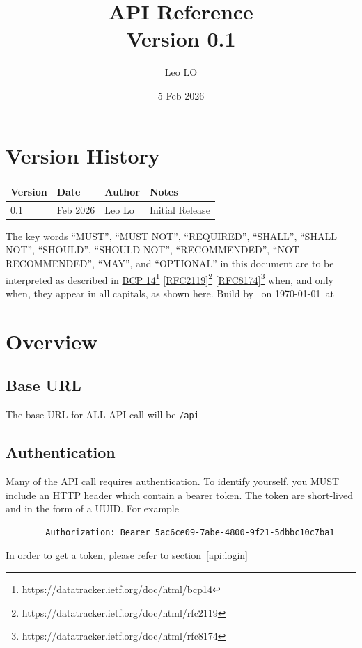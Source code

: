 \documentclass[12pt]{report}
\title{API Reference\\Version 0.1}
\author{Leo LO}
\date{5 Feb 2026}
\begin{document}
    \maketitle
    \chapter*{Version History}
    \begin{tabular}{|l|l|l|p{10cm}|}
        \hline
        Version & Date & Author & Notes \\\hline
        0.1 & Feb 2026 & Leo Lo & Initial Release \\\hline
    \end{tabular}
    \tableofcontents

    \pagebreak
    \hspace{0pt}
    \vfill
    The key words ``MUST'', ``MUST NOT'', ``REQUIRED'', ``SHALL'', ``SHALL NOT'', ``SHOULD'', ``SHOULD NOT'',
    ``RECOMMENDED'', ``NOT RECOMMENDED'', ``MAY'', and ``OPTIONAL'' in this document are to be interpreted as described
    in \href{https://datatracker.ietf.org/doc/html/bcp14}{BCP 14}\footnote{https://datatracker.ietf.org/doc/html/bcp14}
    [\href{https://datatracker.ietf.org/doc/html/rfc2119}{RFC2119}]\footnote{https://datatracker.ietf.org/doc/html/rfc2119}
    [\href{https://datatracker.ietf.org/doc/html/rfc8174}{RFC8174}]\footnote{https://datatracker.ietf.org/doc/html/rfc8174}
    when, and only when, they appear in all capitals, as shown here.
    \vfill
    \hspace{0pt}
    Build by \texenginefull\ on \today\ at \currenttime
    \vfill
    \hspace{0pt}
    \pagebreak
    \chapter{Overview}\label{ch:overview}
    \section{Base URL}\label{sec:overview.base_url}
    The base URL for ALL API call will be \texttt{/api}
    \section{Authentication}\label{sec:overview.authentication}
    Many of the API call requires authentication.
    To identify yourself, you MUST include an HTTP header which contain a bearer token.
    The token are short-lived and in the form of a UUID. For example
    \begin{verbatim}
        Authorization: Bearer 5ac6ce09-7abe-4800-9f21-5dbbc10c7ba1
    \end{verbatim}
    In order to get a token, please refer to section~\ref{api:login}
\end{document}
